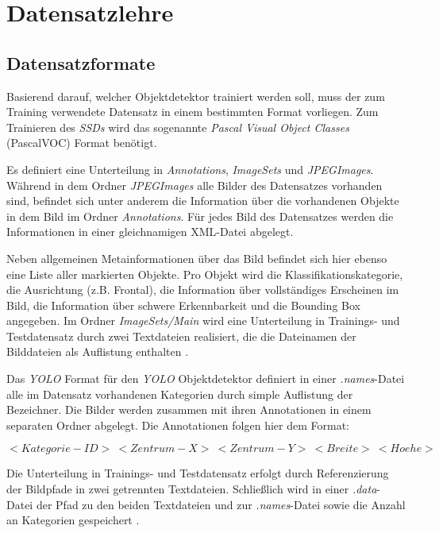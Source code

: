 \section{Datensatzlehre}

\subsection*{Datensatzformate}

Basierend darauf, welcher Objektdetektor trainiert werden soll, muss der zum Training verwendete Datensatz in einem bestimmten Format vorliegen. Zum Trainieren des \textit{SSDs} wird das sogenannte \textit{Pascal Visual Object Classes} (PascalVOC) Format benötigt. 

Es definiert eine Unterteilung in \textit{Annotations}, \textit{ImageSets} und \textit{JPEGImages}. Während in dem Ordner \textit{JPEGImages} alle Bilder des Datensatzes vorhanden sind, befindet sich unter anderem die Information über die vorhandenen Objekte in dem Bild im Ordner \textit{Annotations}. Für jedes Bild des Datensatzes werden die Informationen in einer gleichnamigen XML-Datei abgelegt. 

\lstset{language=XML}


Neben allgemeinen Metainformationen über das Bild befindet sich hier ebenso eine Liste aller markierten Objekte. Pro Objekt wird die Klassifikationskategorie, die Ausrichtung (z.B. \glqq Frontal\grqq{}), die Information über vollständiges Erscheinen im Bild, die Information über schwere Erkennbarkeit und die Bounding Box angegeben. Im Ordner \textit{ImageSets/Main} wird eine Unterteilung in Trainings- und Testdatensatz durch zwei Textdateien realisiert, die die Dateinamen der Bilddateien als Auflistung enthalten \cite{RenuKhandelwal.2019}. 

Das \textit{YOLO} Format für den \textit{YOLO} Objektdetektor definiert in einer \textit{.names}-Datei alle im Datensatz vorhandenen Kategorien durch simple Auflistung der Bezeichner. Die Bilder werden zusammen mit ihren Annotationen in einem separaten Ordner abgelegt. Die Annotationen folgen hier dem Format:

$<Kategorie-ID>\:<Zentrum-X>\:<Zentrum-Y>\:<Breite>\:<Hoehe>$

Die Unterteilung in Trainings- und Testdatensatz erfolgt durch Referenzierung der Bildpfade in zwei getrennten Textdateien. Schließlich wird in einer \textit{.data}-Datei der Pfad zu den beiden Textdateien und zur \textit{.names}-Datei sowie die Anzahl an Kategorien gespeichert \cite{ArunPonnusamy.20191006}. 

